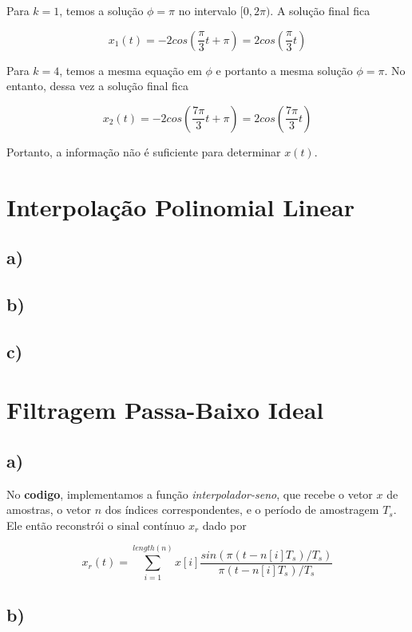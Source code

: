 \documentclass[a4paper, 12pt]{article}
\begin{document}
Para $k=1$, temos a solução $\phi=\pi$ no intervalo $[0, 2\pi).$ A solução final fica

$$x_1(t)=-2cos(\frac{\pi}{3}t + \pi)=2cos(\frac{\pi}{3}t)$$

Para $k=4$, temos a mesma equação em $\phi$ e portanto a mesma solução $\phi=\pi$. No entanto, dessa vez a solução final fica

$$x_2(t)=-2cos(\frac{7\pi}{3}t + \pi)=2cos(\frac{7\pi}{3}t)$$

Portanto, a informação não é suficiente para determinar $x(t)$.

\section{Interpolação Polinomial Linear}

\subsection{a)}

\subsection{b)}

\subsection{c)}

\section{Filtragem Passa-Baixo Ideal}

\subsection{a)}

No \textbf{codigo}, implementamos a função \textit{interpolador-seno}, que recebe o vetor $x$ de amostras, o vetor $n$ dos índices correspondentes, e o período de amostragem $T_s$. Ele então reconstrói o sinal contínuo $x_r$ dado por

$$x_r(t) = \sum_{i=1}^{length(n)}x[i]\frac{sin(\pi (t - n[i]T_s)/T_s)}{\pi (t - n[i]T_s)/T_s}$$ 



\subsection{b)}
\end{document}

